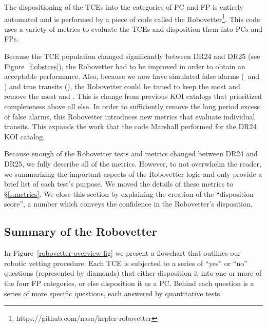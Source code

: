 \label{s:robovetter}
The dispositioning of the TCEs into the categories of PC and FP is entirely automated and is performed by a piece of code called the Robovetter\footnote{https://github.com/nasa/kepler-robovetter}. This code uses a variety of metrics to evaluate the TCEs and disposition them into PCs and FPs.  


Because the TCE population changed significantly between DR24 and DR25 (see Figure~\ref{f:obstces}), the Robovetter had to be improved in order to obtain an acceptable performance.  Also, because we now have simulated false alarms (\invtce\ and \scrtce) and true transits (\injtce), the Robovetter could be tuned to keep the most  and remove the most  and . This is change from previous KOI catalogs that prioritized completeness above all else.  In order to sufficiently remove the long period excess of false alarms, this Robovetter introduces new metrics that evaluate individual transits. This expands the work that the code Marshall \citep{Mullally2015c} performed for the DR24 KOI catalog.

Because enough of the Robovetter tests and metrics changed between DR24 and DR25, we fully describe all of the metrics.  However, to not overwhelm the reader, we summarizing the important aspects of the Robovetter logic and only provide a brief list of each test's purpose. We moved the details of these metrics to \S\ref{s:metrics}. We close this section by explaining the creation of the ``disposition score'', a number which conveys the confidence in the Robovetter's disposition.

\subsection{Summary of the Robovetter}

In Figure~\ref{robovetter-overview-fig} we present a flowchart that outlines our robotic vetting procedure. Each TCE is subjected to a series of ``yes'' or ``no'' questions (represented by diamonds) that either disposition it into one or more of the four FP categories, or else disposition it as a PC. Behind each question is a series of more specific questions, each answered by quantitative tests. 


